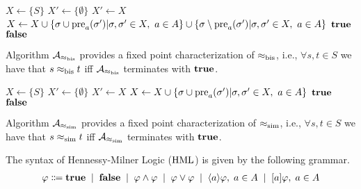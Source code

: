 \begin{algorithm}[htp]
\caption{$\algo_{\equbis}$}
\label{alg:bis}
\begin{algorithmic}
    \State $X \gets \{ S \}$
    \State $X' \gets \{ \emptyset\}$
        \State $X' \gets X$
        \State $X \gets X \cup \{ \sigma \cup \operatorname{pre}_a(\sigma') | \sigma, \sigma' \in X,\ a \in A \} \cup \{ \sigma \setminus \operatorname{pre}_a(\sigma') | \sigma, \sigma' \in X,\ a \in A \}$
    \EndWhile
        \State \Return $\mathbf{true}$
    \EndIf
    \State \Return $\mathbf{false}$
\end{algorithmic}
\end{algorithm}



\begin{theorem}
        Algorithm $\algo_{\equbis}$ provides a fixed point characterization of $\approx_{\mathrm{bis}}$, i.e., $\forall s, t\in S$ we have that $s \approx_{\mathrm{bis}} t$ iff  $\algo_{\equbis}$ terminates with $\mathbf{true}$.
\end{theorem}

\begin{algorithm}[htp]
\caption{$\algo_{\equsim}$}
\label{alg:bis}
\begin{algorithmic}
    \State $X \gets \{ S \}$
    \State $X' \gets \{ \emptyset\}$
        \State $X' \gets X$
        \State $X \gets X \cup \{ \sigma \cup \operatorname{pre}_a(\sigma') | \sigma, \sigma' \in X,\ a \in A \}$
    \EndWhile
        \State \Return $\mathbf{true}$
    \EndIf
    \State \Return $\mathbf{false}$
\end{algorithmic}
\end{algorithm}



\begin{theorem}
        Algorithm $\algo_{\equsim}$ provides a fixed point characterization of $\approx_{\mathrm{sim}}$, i.e., $\forall s, t\in S$ we have that $s \approx_{\mathrm{sim}} t$ iff  $\algo_{\equsim}$ terminates with $\mathbf{true}$.
\end{theorem}

\begin{definition}
    The syntax of Hennessy-Milner Logic ($\operatorname{HML}$) is given by the following grammar.
    \begin{align*}
        \varphi \Coloneqq\mathbf{true}  \; \mid \;  \mathbf{false} \; \mid \;  \varphi \land \varphi \; \mid \;  \varphi \lor \varphi \; \mid \;  \langle a \rangle \varphi  ,\;  a \in A \; \mid \;  [ a ] \varphi,\;  a \in A
    \end{align*}
    \end{definition}


